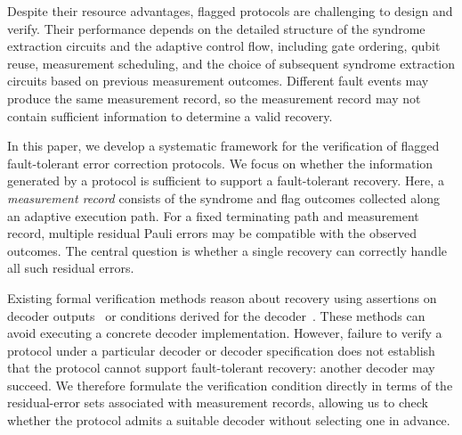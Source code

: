 \documentclass[acmsmall,screen,review,anonymous,nonacm]{acmart}
\begin{document}
Despite their resource advantages, flagged protocols are challenging to
design and verify. Their performance depends on the detailed structure of
the syndrome extraction circuits and the adaptive control flow, including
gate ordering, qubit reuse, measurement scheduling, and the choice of
subsequent syndrome extraction circuits based on previous measurement
outcomes. Different fault events may produce the same measurement record,
so the measurement record may not contain sufficient information to determine
a valid recovery.

In this paper, we develop a systematic framework for the verification of
flagged fault-tolerant error correction protocols. We focus on whether the
information generated by a protocol is sufficient to support a fault-tolerant
recovery. Here, a \emph{measurement record} consists of the syndrome and flag
outcomes collected along an adaptive execution path. For a fixed terminating
path and measurement record, multiple residual Pauli errors may be compatible
with the observed outcomes. The central question is whether a single recovery
can correctly handle all such residual errors.





Existing formal verification methods reason about recovery using
assertions on decoder outputs~\cite{chen2025verifying} or conditions
derived for the decoder~\cite{10.1145/3729293}.
These methods can avoid executing a concrete decoder implementation.
However, failure to verify a protocol under a particular decoder
or decoder specification does not establish that the protocol
cannot support fault-tolerant recovery: another decoder may succeed.
We therefore formulate the verification condition directly in terms
of the residual-error sets associated with measurement records,
allowing us to check whether the protocol admits a suitable decoder
without selecting one in advance.
\end{document}
